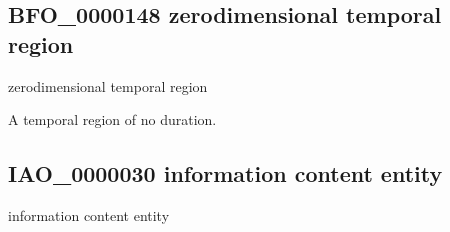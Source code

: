 \documentclass[letterpaper,10pt,english]{sphinxmanual}
\begin{document}
\subsection{BFO\_0000148 \sphinxhyphen{} zero\sphinxhyphen{}dimensional temporal region}
\label{\detokenize{doc-BFO_0000148:bfo-0000148-zero-dimensional-temporal-region}}\label{\detokenize{doc-BFO_0000148:index-0}}\label{\detokenize{doc-BFO_0000148::doc}}
\begin{sphinxShadowBox}

\sphinxAtStartPar
zero\sphinxhyphen{}dimensional temporal region
\end{sphinxShadowBox}

\begin{sphinxShadowBox}

\sphinxAtStartPar
{\hyperref[\detokenize{doc-BFO_0000008::doc}]{}}
\end{sphinxShadowBox}

\begin{sphinxShadowBox}

\sphinxAtStartPar
A temporal region of no duration.
\end{sphinxShadowBox}

\begin{sphinxShadowBox}

\sphinxAtStartPar
{}
\end{sphinxShadowBox}
\begin{quote}

\ignorespaces \end{quote}


\subsection{IAO\_0000030 \sphinxhyphen{} information content entity}
\label{\detokenize{doc-IAO_0000030:iao-0000030-information-content-entity}}\label{\detokenize{doc-IAO_0000030:index-0}}\label{\detokenize{doc-IAO_0000030::doc}}
\begin{sphinxShadowBox}

\sphinxAtStartPar
information content entity
\end{sphinxShadowBox}
\end{document}
